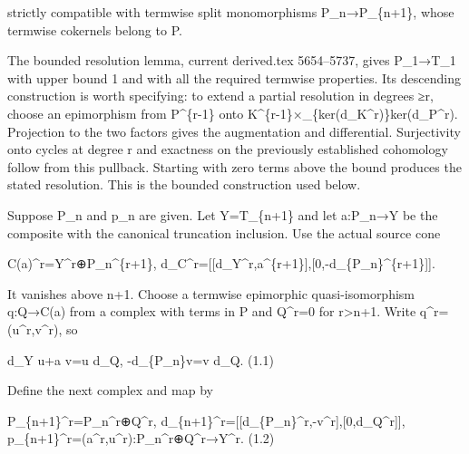 strictly compatible with termwise split monomorphisms P\_\allowbreak{}n\allowbreak{}→P\_\allowbreak{}\{n\allowbreak{}+1\},\allowbreak{} whose termwise cokernels belong to P.

The bounded resolution lemma,\allowbreak{} current derived.tex 5654–\allowbreak{}5737,\allowbreak{} gives P\_\allowbreak{}1\allowbreak{}→T\_\allowbreak{}1 with upper bound 1 and with all the required termwise properties. Its descending construction is worth specifying:\allowbreak{} to extend a partial resolution in degrees ≥r,\allowbreak{} choose an epimorphism from P\^{}\{r-1\} onto K\textasciicircum{}\{r-1\}×\_\allowbreak{}\{ker(d\_\allowbreak{}K\textasciicircum{}r)\allowbreak{}\}ker(d\_\allowbreak{}P\textasciicircum{}r)\allowbreak{}. Projection to the two factors gives the augmentation and differential. Surjectivity onto cycles at degree r and exactness on the previously established cohomology follow from this pullback. Starting with zero terms above the bound produces the stated resolution. This is the bounded construction used below.

Suppose P\_\allowbreak{}n and p\_\allowbreak{}n are given. Let Y\allowbreak{}=T\_\allowbreak{}\{n\allowbreak{}+1\} and let a:\allowbreak{}P\_\allowbreak{}n\allowbreak{}→Y be the composite with the canonical truncation inclusion. Use the actual source cone

C(a)\allowbreak{}\textasciicircum{}r\allowbreak{}=Y\textasciicircum{}r\allowbreak{}⊕P\_\allowbreak{}n\textasciicircum{}\{r\allowbreak{}+1\},\allowbreak{} d\_\allowbreak{}C\textasciicircum{}r\allowbreak{}=[[d\_\allowbreak{}Y\textasciicircum{}r,\allowbreak{}a\textasciicircum{}\{r\allowbreak{}+1\}]\allowbreak{},\allowbreak{}[0,\allowbreak{}-d\_\allowbreak{}\{P\_\allowbreak{}n\}\textasciicircum{}\{r\allowbreak{}+1\}]\allowbreak{}]\allowbreak{}.

It vanishes above n\allowbreak{}+1. Choose a termwise epimorphic quasi-isomorphism q:\allowbreak{}Q\allowbreak{}→C(a)\allowbreak{} from a complex with terms in P and Q\textasciicircum{}r\allowbreak{}=0 for r>n\allowbreak{}+1. Write q\textasciicircum{}r\allowbreak{}=(u\textasciicircum{}r,\allowbreak{}v\textasciicircum{}r)\allowbreak{},\allowbreak{} so

d\_\allowbreak{}Y u\allowbreak{}+a v\allowbreak{}=u d\_\allowbreak{}Q,\allowbreak{} -d\_\allowbreak{}\{P\_\allowbreak{}n\}v\allowbreak{}=v d\_\allowbreak{}Q. (1.1)\allowbreak{}

Define the next complex and map by

P\_\allowbreak{}\{n\allowbreak{}+1\}\textasciicircum{}r\allowbreak{}=P\_\allowbreak{}n\textasciicircum{}r\allowbreak{}⊕Q\textasciicircum{}r,\allowbreak{} d\_\allowbreak{}\{n\allowbreak{}+1\}\textasciicircum{}r\allowbreak{}=[[d\_\allowbreak{}\{P\_\allowbreak{}n\}\textasciicircum{}r,\allowbreak{}-v\textasciicircum{}r]\allowbreak{},\allowbreak{}[0,\allowbreak{}d\_\allowbreak{}Q\textasciicircum{}r]\allowbreak{}]\allowbreak{},\allowbreak{} p\_\allowbreak{}\{n\allowbreak{}+1\}\textasciicircum{}r\allowbreak{}=(a\textasciicircum{}r,\allowbreak{}u\textasciicircum{}r)\allowbreak{}:\allowbreak{}P\_\allowbreak{}n\textasciicircum{}r\allowbreak{}⊕Q\textasciicircum{}r\allowbreak{}→Y\textasciicircum{}r. (1.2)\allowbreak{}

